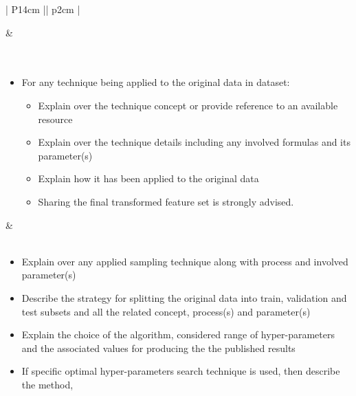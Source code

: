 \begin{table}[ht]
\begin{tabular}{| P{14cm} || p{2cm} |}
\begin{itemize}
            \end{itemize} &\\
        \hline \hline
        \\
        \hline
        \\ 
        \hline
            \begin{itemize}
                    \item
                    {\small For any technique being applied to the original data in dataset:}
                        \begin{itemize}
                            \item
                            {\footnotesize Explain over the technique concept or provide reference to an available resource}
                            \item
                            {\footnotesize Explain over the technique details including any involved formulas and its parameter(s)}
                            \item
                            {\footnotesize Explain how it has been applied to the original data}
                            \item
                            {\footnotesize Sharing the final transformed feature set is strongly advised.}
                        \end{itemize}
            \end{itemize}&\\
        \hline
        \\ 
        \hline
            \begin{itemize}
                \item
                {\small Explain over any applied sampling technique along with process and involved parameter(s) }
                \item
                {\small Describe the strategy for splitting the original data into train, validation and test subsets and all 
                the related concept, process(s) and parameter(s)}
                \item
                {\small Explain the choice of the algorithm, considered range of hyper-parameters and the associated values for 
                producing the the published results}
                \item
                {\small If specific optimal hyper-parameters search technique is used, then describe the method, 
}
\end{itemize}
\end{tabular}
\end{table}
